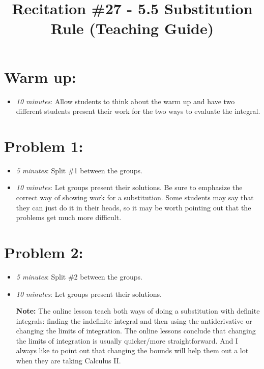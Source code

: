 \documentclass[handout,nooutcomes]{ximera}
\title{Recitation \#27 - 5.5 Substitution Rule (Teaching Guide)}
\begin{document}
\begin{abstract}		\end{abstract}
\maketitle


\section*{Warm up:} 
	
	\begin{itemize}
	
	\item  \emph{10 minutes}:  Allow students to think about the warm up and have two different students present their work for the two ways to evaluate the integral.
	
	
	
	\end{itemize}


\section*{Problem 1:}

	\begin{itemize}
	
	\item  \emph{5 minutes}:  Split \#1 between the groups.
	
	\item  \emph{10 minutes}:  Let groups present their solutions.  Be sure to emphasize the correct way of showing work for a substitution.  Some students may say that they can just do it in their heads, so it may be worth pointing out that the problems get much more difficult.
	
	\end{itemize}



\section*{Problem 2:}

	\begin{itemize}
	
	\item  \emph{5 minutes}:  Split \#2 between the groups.
		
	\item  \emph{10 minutes}:  Let groups present their solutions.
	
	{\bf Note:} The online lesson teach both ways of doing a substitution with definite integrals:  finding the indefinite integral and then using the antiderivative or changing the limits of integration.  The online lessons conclude that changing the limits of integration is usually quicker/more straightforward.  And I always like to point out that changing the bounds will help them out a lot when they are taking Calculus II.
			
	\end{itemize}
	
\end{document}
